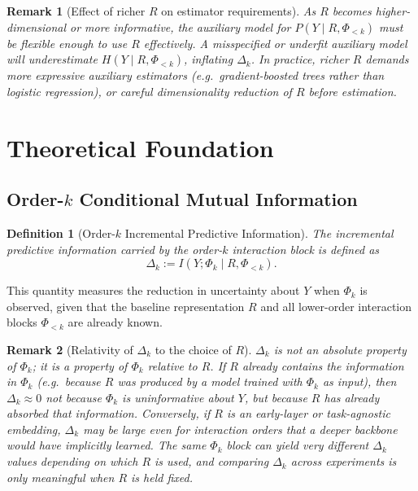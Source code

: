 \documentclass[11pt]{article}
\newtheorem{definition}{Definition}
\newtheorem{remark}{Remark}
\newcommand{\1}{\mathbf{1}}
\begin{document}
\begin{remark}[Effect of richer $R$ on estimator requirements]
As $R$ becomes higher-dimensional or more informative, the auxiliary model for
$P(Y \mid R, \Phi_{<k})$ must be flexible enough to use $R$ effectively.
A misspecified or underfit auxiliary model will underestimate $H(Y \mid R, \Phi_{<k})$,
inflating $\Delta_k$.
In practice, richer $R$ demands more expressive auxiliary estimators (e.g.\ gradient-boosted
trees rather than logistic regression), or careful dimensionality reduction of $R$ before
estimation.
\end{remark}

\section{Theoretical Foundation}

\subsection{Order-$k$ Conditional Mutual Information}

\begin{definition}[Order-$k$ Incremental Predictive Information]
The incremental predictive information carried by the order-$k$ interaction block is defined as
\begin{equation}
\Delta_k
:=
I(Y;\Phi_k \mid R,\Phi_{<k}).
\label{eq:delta_k_def}
\end{equation}
\end{definition}

This quantity measures the reduction in uncertainty about $Y$ when $\Phi_k$ is observed, given that
the baseline representation $R$ and all lower-order interaction blocks $\Phi_{<k}$ are already known.

\begin{remark}[Relativity of $\Delta_k$ to the choice of $R$]
$\Delta_k$ is not an absolute property of $\Phi_k$; it is a property of $\Phi_k$
\emph{relative to $R$}.
If $R$ already contains the information in $\Phi_k$ (e.g.\ because $R$ was produced by a model
trained with $\Phi_k$ as input), then $\Delta_k \approx 0$ not because $\Phi_k$ is uninformative
about $Y$, but because $R$ has already absorbed that information.
Conversely, if $R$ is an early-layer or task-agnostic embedding, $\Delta_k$ may be large even for
interaction orders that a deeper backbone would have implicitly learned.
The same $\Phi_k$ block can yield very different $\Delta_k$ values depending on which $R$ is used,
and comparing $\Delta_k$ across experiments is only meaningful when $R$ is held fixed.
\end{remark}
\end{document}
